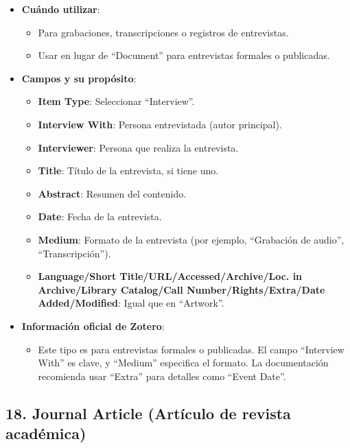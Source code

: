 \documentclass[
  jou,
  floatsintext,
  longtable,
  a4paper,
  nolmodern,
  notxfonts,
  notimes,
  colorlinks=true,linkcolor=blue,citecolor=blue,urlcolor=blue]{apa7}
\providecommand{\tightlist}{%
  \setlength{\itemsep}{0pt}\setlength{\parskip}{0pt}}
\begin{document}
\begin{itemize}
\tightlist
\item
  \textbf{Cuándo utilizar}:

  \begin{itemize}
  \tightlist
  \item
    Para grabaciones, transcripciones o registros de entrevistas.
  \item
    Usar en lugar de ``Document'' para entrevistas formales o
    publicadas.
  \end{itemize}
\item
  \textbf{Campos y su propósito}:

  \begin{itemize}
  \tightlist
  \item
    \textbf{Item Type}: Seleccionar ``Interview''.
  \item
    \textbf{Interview With}: Persona entrevistada (autor principal).
  \item
    \textbf{Interviewer}: Persona que realiza la entrevista.
  \item
    \textbf{Title}: Título de la entrevista, si tiene uno.
  \item
    \textbf{Abstract}: Resumen del contenido.
  \item
    \textbf{Date}: Fecha de la entrevista.
  \item
    \textbf{Medium}: Formato de la entrevista (por ejemplo, ``Grabación
    de audio'', ``Transcripción'').
  \item
    \textbf{Language/Short Title/URL/Accessed/Archive/Loc. in
    Archive/Library Catalog/Call Number/Rights/Extra/Date
    Added/Modified}: Igual que en ``Artwork''.
  \end{itemize}
\item
  \textbf{Información oficial de Zotero}:

  \begin{itemize}
  \tightlist
  \item
    Este tipo es para entrevistas formales o publicadas. El campo
    ``Interview With'' es clave, y ``Medium'' especifica el formato. La
    documentación recomienda usar ``Extra'' para detalles como ``Event
    Date''.
  \end{itemize}
\end{itemize}

\subsection{18. Journal Article (Artículo de revista
académica)}\label{journal-article-artuxedculo-de-revista-acaduxe9mica}
\end{document}

